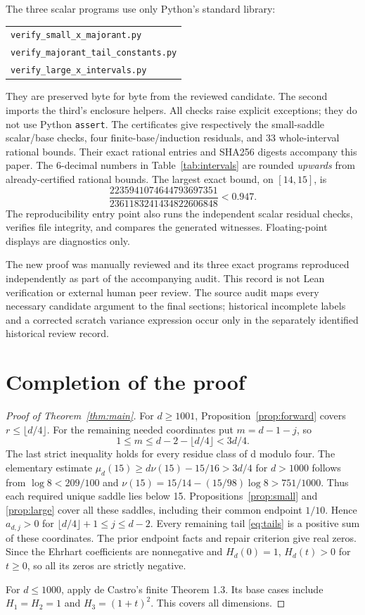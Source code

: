 \documentclass[11pt]{article}
\theoremstyle{remark}\newtheorem{remark}[theorem]{Remark}
\begin{document}
The three scalar programs use only Python's standard library:
\begin{center}\small\begin{tabular}{l}
\texttt{verify\_small\_x\_majorant.py}\\
\texttt{verify\_majorant\_tail\_constants.py}\\
\texttt{verify\_large\_x\_intervals.py}
\end{tabular}\end{center}
They are preserved byte for byte from the reviewed candidate.
The second imports the third's enclosure helpers. All checks raise explicit
exceptions; they do not use Python \texttt{assert}.
The certificates give respectively the small-saddle scalar/base checks,
four finite-base/induction residuals, and 33 whole-interval rational bounds.
Their exact rational entries and SHA256 digests accompany this paper.
The 6-decimal numbers in Table~\ref{tab:intervals} are rounded
\emph{upwards} from already-certified rational bounds.
The largest exact bound, on $[14,15]$, is
\[
 \frac{2235941074644793697351}{2361183241434822606848}<0.947.
\]
The reproducibility entry point also runs the independent scalar residual
checks, verifies file integrity, and compares the generated witnesses.
Floating-point displays are diagnostics only.

The new proof was manually reviewed and its three exact programs reproduced
independently as part of the accompanying audit. This record is not Lean
verification or external human peer review. The source audit maps every
necessary candidate argument to the final sections; historical incomplete
labels and a corrected scratch variance expression occur only in the
separately identified historical review record.

\section{Completion of the proof}\label{sec:completion}
\begin{proof}[Proof of Theorem~\ref{thm:main}]
For $d\ge1001$, Proposition~\ref{prop:forward} covers
$r\le\lfloor d/4\rfloor$. For the remaining needed coordinates put
$m=d-1-j$, so
\[
 1\le m\le d-2-\lfloor d/4\rfloor<3d/4.
\]
The last strict inequality holds for every residue class of d modulo four.
The elementary estimate
$\mu_d(15)\ge d\nu(15)-15/16>3d/4$ for $d>1000$ follows from
$\log8<209/100$ and
$\nu(15)=15/14-(15/98)\log8>751/1000$.
Thus each required unique saddle lies below 15.
Propositions~\ref{prop:small} and \ref{prop:large} cover all these saddles,
including their common endpoint $1/10$.
Hence $a_{d,j}>0$ for $\lfloor d/4\rfloor+1\le j\le d-2$.
Every remaining tail \eqref{eq:tails} is a positive sum of these coordinates.
The prior endpoint facts and repair criterion give real zeros.
Since the Ehrhart coefficients are nonnegative and $H_d(0)=1$,
$H_d(t)>0$ for $t\ge0$, so all its zeros are strictly negative.

For $d\le1000$, apply de Castro's finite Theorem 1.3.
Its base cases include $H_1=H_2=1$ and $H_3=(1+t)^2$.
This covers all dimensions.
\end{proof}
\end{document}
